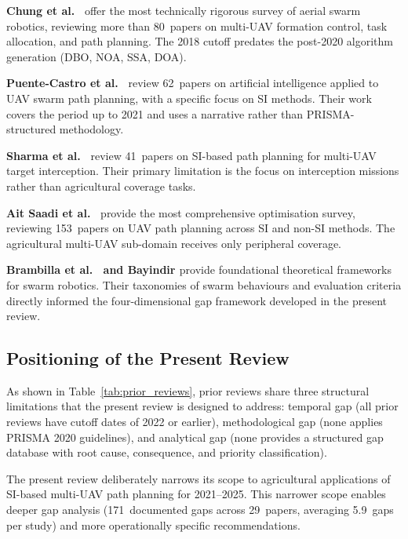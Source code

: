 \documentclass[review,3p]{elsarticle}
\begin{document}
\textbf{Chung et al.\ \cite{chung2018}} offer the most technically rigorous
survey of aerial swarm robotics, reviewing more than 80~papers on multi-UAV
formation control, task allocation, and path planning. The 2018 cutoff predates
the post-2020 algorithm generation (DBO, NOA, SSA, DOA).

\textbf{Puente-Castro et al.\ \cite{puente2022}} review 62~papers on artificial
intelligence applied to UAV swarm path planning, with a specific focus on SI
methods. Their work covers the period up to 2021 and uses a narrative rather
than PRISMA-structured methodology.

\textbf{Sharma et al.\ \cite{sharma2022}} review 41~papers on SI-based path
planning for multi-UAV target interception. Their primary limitation is the
focus on interception missions rather than agricultural coverage tasks.

\textbf{Ait Saadi et al.\ \cite{aitsaadi2022}} provide the most comprehensive
optimisation survey, reviewing 153~papers on UAV path planning across SI and
non-SI methods. The agricultural multi-UAV sub-domain receives only peripheral
coverage.

\textbf{Brambilla et al.\ \cite{brambilla2013} and Bayindir \cite{bayindir2016}}
provide foundational theoretical frameworks for swarm robotics. Their taxonomies
of swarm behaviours and evaluation criteria directly informed the four-dimensional
gap framework developed in the present review.

\subsection*{Positioning of the Present Review}

As shown in Table~\ref{tab:prior_reviews}, prior reviews share three structural
limitations that the present review is designed to address: temporal gap (all
prior reviews have cutoff dates of 2022 or earlier), methodological gap (none
applies PRISMA 2020 guidelines), and analytical gap (none provides a structured
gap database with root cause, consequence, and priority classification).

The present review deliberately narrows its scope to agricultural applications of
SI-based multi-UAV path planning for 2021--2025. This narrower scope enables
deeper gap analysis (171~documented gaps across 29~papers, averaging
5.9~gaps per study) and more operationally specific recommendations.


\end{document}
